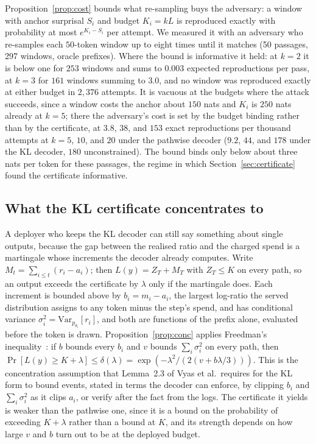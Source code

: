 Proposition~\ref{prop:cost} bounds what re-sampling buys the adversary: a window with anchor surprisal $S_i$ and budget $K_i = kL$ is reproduced exactly with probability at most $e^{K_i - S_i}$ per attempt. We measured it with an adversary who re-samples each $50$-token window up to eight times until it matches (50 passages, 297 windows, oracle prefixes). Where the bound is informative it held: at $k=2$ it is below one for $253$ windows and sums to $0.003$ expected reproductions per pass, at $k=3$ for $161$ windows summing to $3.0$, and no window was reproduced exactly at either budget in $2{,}376$ attempts. It is vacuous at the budgets where the attack succeeds, since a window costs the anchor about $150$ nats and $K_i$ is $250$ nats already at $k=5$; there the adversary's cost is set by the budget binding rather than by the certificate, at $3.8$, $38$, and $153$ exact reproductions per thousand attempts at $k=5$, $10$, and $20$ under the pathwise decoder ($9.2$, $44$, and $178$ under the KL decoder, $180$ unconstrained). The bound binds only below about three nats per token for these passages, the regime in which Section~\ref{sec:certificate} found the certificate informative.

\subsection{What the KL certificate concentrates to}\label{sec:concentration}
A deployer who keeps the KL decoder can still say something about single outputs, because the gap between the realised ratio and the charged spend is a martingale whose increments the decoder already computes. Write $M_t = \sum_{i \le t}(r_i - a_i)$; then $L(y) = Z_T + M_T$ with $Z_T \le K$ on every path, so an output exceeds the certificate by $\lambda$ only if the martingale does. Each increment is bounded above by $b_i = m_i - a_i$, the largest log-ratio the served distribution assigns to any token minus the step's spend, and has conditional variance $\sigma_i^2 = \mathrm{Var}_{p_{\theta_i}}[r_i]$, and both are functions of the prefix alone, evaluated before the token is drawn. Proposition~\ref{prop:conc} applies Freedman's inequality~\cite{freedman1975tail,tropp2011freedman}: if $b$ bounds every $b_i$ and $v$ bounds $\sum_i \sigma_i^2$ on every path, then $\Pr[L(y) \ge K + \lambda] \le \delta(\lambda) = \exp(-\lambda^2 / (2(v + b\lambda/3)))$. This is the concentration assumption that Lemma~2.3 of Vyas et al.\ requires for the KL form to bound events, stated in terms the decoder can enforce, by clipping $b_i$ and $\sum_i \sigma_i^2$ as it clips $a_i$, or verify after the fact from the logs. The certificate it yields is weaker than the pathwise one, since it is a bound on the probability of exceeding $K + \lambda$ rather than a bound at $K$, and its strength depends on how large $v$ and $b$ turn out to be at the deployed budget.

